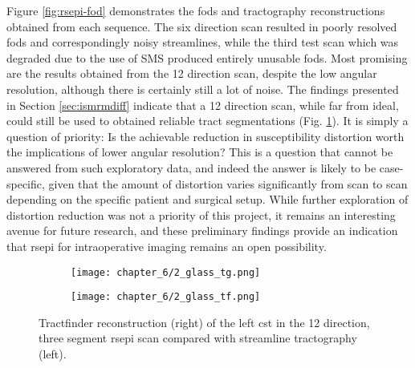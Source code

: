 Figure \ref{fig:rsepi-fod} demonstrates the \glspl{fod} and tractography reconstructions obtained from each sequence.
The six direction scan resulted in poorly resolved \glspl{fod} and correspondingly noisy streamlines, while the third test scan which was degraded due to the use of SMS produced entirely unusable \glspl{fod}.
Most promising are the results obtained from the 12 direction scan, despite the low angular resolution, although there is certainly still a lot of noise.
The findings presented in Section \ref{sec:ismrmdiff} indicate that a 12 direction scan, while far from ideal, could still be used to obtained reliable tract segmentations (Fig. \ref{fig:ssepi2}).
It is simply a question of priority:
Is the achievable reduction in susceptibility distortion worth the implications of lower angular resolution?
This is a question that cannot be answered from such exploratory data, and indeed the answer is likely to be case-specific, given that the amount of distortion varies significantly from scan to scan depending on the specific patient and surgical setup.
While further exploration of distortion reduction was not a priority of this project, it remains an interesting avenue for future research, and these preliminary findings provide an indication that \gls{rsepi} for intraoperative imaging remains an open possibility.

\begin{figure}
  \centering
  \begin{subfigure}{0.4\textwidth}
    \texttt{[image: chapter\_6/2\_glass\_tg.png]}
  \end{subfigure}%
  \begin{subfigure}{0.4\textwidth}
    \texttt{[image: chapter\_6/2\_glass\_tf.png]}
  \end{subfigure}
  \caption[RS-EPI 12 direction test scan CST reconstructions with tractography and tractfinder]{Tractfinder reconstruction (right) of the left \gls{cst} in the 12 direction, three segment \gls{rsepi} scan compared with streamline tractography (left).}
  \label{fig:ssepi2}
\end{figure}
